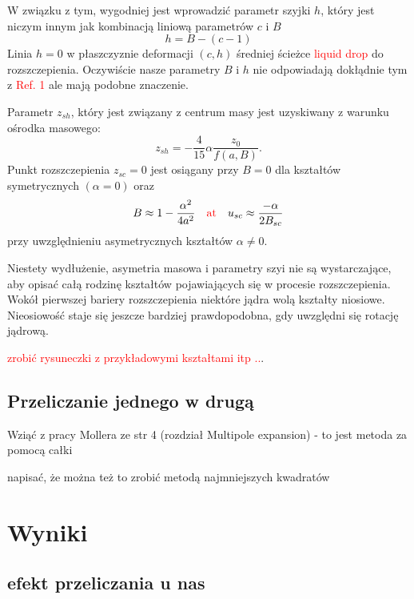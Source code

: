 \documentclass[polish]{article}
\numberwithin{equation}{section}
\begin{document}
W związku z tym, wygodniej jest wprowadzić parametr szyjki $h$, który jest niczym innym jak kombinacją liniową parametrów $c$ i $B$
\begin{equation}
h=B-(c-1)
\end{equation}
Linia $h=0$ w płaszczyznie deformacji $(c,h)$ średniej ścieżce \textcolor{red}{liquid drop} do 	rozszczepienia. Oczywiście nasze parametry $B$ i $h$ nie odpowiadają dokłądnie tym z \textcolor{red}{Ref. 1} ale mają podobne znaczenie.

Parametr $z_{sh}$, który jest związany z centrum masy jest uzyskiwany z warunku ośrodka masowego:
\begin{equation}
z_{sh}=-\frac{4}{15}\alpha \frac{z_{0}}{f(a,B)}.
\end{equation}
Punkt rozszczepienia $z_{sc}=0$ jest osiągany przy $B=0$ dla kształtów symetrycznych $(\alpha=0)$ oraz
\begin{equation}
B\approx 1-\frac{\alpha^{2}}{4a^{2}} \quad \textcolor{red}{\textrm{at}} \quad u_{sc}\approx \frac{-\alpha}{2B_{sc}}
\end{equation}
przy uwzględnieniu asymetrycznych kształtów $\alpha\neq 0$.

Niestety wydłużenie, asymetria masowa i parametry szyi nie są wystarczające, aby opisać całą rodzinę kształtów pojawiających się w procesie rozszczepienia. Wokół pierwszej bariery rozszczepienia niektóre jądra wolą kształty niosiowe. Nieosiowość staje się jeszcze bardziej prawdopodobna, gdy uwzględni się rotację jądrową.

\bigskip
\textcolor{red}{zrobić rysuneczki z przykładowymi kształtami itp ..}.

\subsection{Przeliczanie jednego w drugą}

Wziąć z pracy Mollera ze str 4 (rozdział Multipole expansion) - to jest metoda za pomocą całki

napisać, że można też to zrobić metodą najmniejszych kwadratów

\section{Wyniki}

\subsection{efekt przeliczania u nas}
\end{document}
